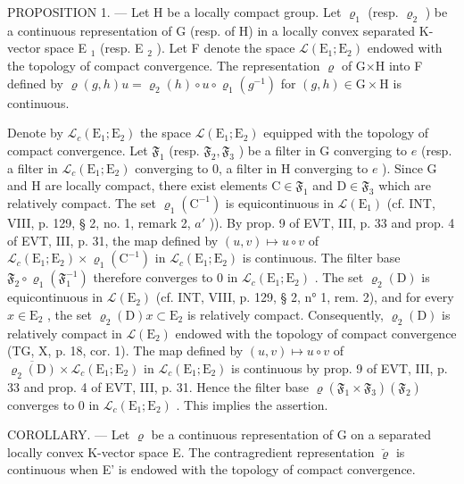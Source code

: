 PROPOSITION 1. — Let H be a locally compact group. Let \(\varrho_{1}\) (resp. \(\varrho_{2}\) ) be a continuous representation of G (resp. of H) in a locally convex separated K-vector space E \(_{1}\) (resp. E \(_{2}\) ). Let F denote the space \(\mathcal{L}(\mathrm{E}_{1};\mathrm{E}_{2})\) endowed with the topology of compact convergence. The representation \(\varrho\) of G×H into F defined by \(\varrho(g,h)u=\varrho_{2}(h)\circ u\circ\varrho_{1}(g^{-1})\) for \((g,h)\in\mathrm{G}\times\mathrm{H}\) is continuous.

Denote by \(\mathcal{L}_c(\mathrm{E}_1;\mathrm{E}_2)\) the space \(\mathcal{L}(\mathrm{E}_1;\mathrm{E}_2)\) equipped with the topology of compact convergence. Let \(\mathfrak{F}_1\) (resp. \(\mathfrak{F}_2,\mathfrak{F}_3\) ) be a filter in G converging to \(e\) (resp. a filter in \(\mathcal{L}_c(\mathrm{E}_1;\mathrm{E}_2)\) converging to 0, a filter in H converging to \(e\) ). Since G and H are locally compact, there exist elements \(\mathrm{C}\in \mathfrak{F}_1\) and \(\mathrm{D}\in \mathfrak{F}_3\) which are relatively compact. The set \(\varrho_1(\mathrm{C}^{-1})\) is equicontinuous in \(\mathcal{L}(\mathrm{E}_1)\) (cf. INT, VIII, p. 129, § 2, no. 1, remark 2, \(a'\) )). By prop. 9 of EVT, III, p. 33 and prop. 4 of EVT, III, p. 31, the map defined by \((u,v)\mapsto u\circ v\) of \(\mathcal{L}_c(\mathrm{E}_1;\mathrm{E}_2)\times \varrho_1(\mathrm{C}^{-1})\) in \(\mathcal{L}_c(\mathrm{E}_1;\mathrm{E}_2)\) is continuous. The filter base \(\mathfrak{F}_2\circ \varrho_1(\mathfrak{F}_1^{-1})\) therefore converges to 0 in \(\mathcal{L}_c(\mathrm{E}_1;\mathrm{E}_2)\) . The set \(\varrho_2(\mathrm{D})\) is equicontinuous in \(\mathcal{L}(\mathrm{E}_2)\) (cf. INT, VIII, p. 129, § 2, n° 1, rem. 2), and for every \(x\in \mathrm{E}_2\) , the set \(\varrho_2(\mathrm{D})x\subset \mathrm{E}_2\) is relatively compact. Consequently, \(\varrho_2(\mathrm{D})\) is relatively compact in \(\mathcal{L}(\mathrm{E}_2)\) endowed with the topology of compact convergence (TG, X, p. 18, cor. 1). The map defined by \((u,v)\mapsto u\circ v\) of \(\overline{\varrho_2(\mathrm{D})}\times \mathcal{L}_c(\mathrm{E}_1;\mathrm{E}_2)\) in \(\mathcal{L}_c(\mathrm{E}_1;\mathrm{E}_2)\) is continuous by prop. 9 of EVT, III, p. 33 and prop. 4 of EVT, III, p. 31. Hence the filter base \(\varrho (\mathfrak{F}_1\times \mathfrak{F}_3)(\mathfrak{F}_2)\) converges to 0 in \(\mathcal{L}_c(\mathrm{E}_1;\mathrm{E}_2)\) . This implies the assertion.

COROLLARY. --- Let \(\varrho\) be a continuous representation of G on a separated locally convex K-vector space E. The contragredient representation \(\breve{\varrho}\) is continuous when E' is endowed with the topology of compact convergence.

